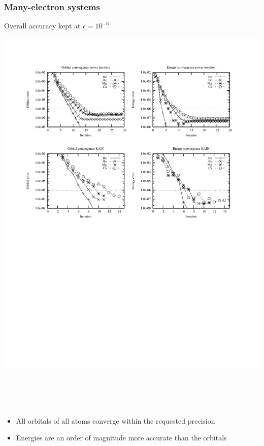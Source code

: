 \begin{frame}
    \frametitle{Many-electron systems}
    \centering
    Overall accuracy kept at $\epsilon = 10^{-6}$
    \begin{center}
	\includegraphics[scale=0.6, clip, viewport = 50 550 550 740]{figures/accuracy.pdf}
    \end{center}
    \ \\
    \ \\
    \ \\
    \begin{itemize}
	\item All orbitals of all atoms converge within the requested precision
	\item Energies are an order of magnitude more accurate than the orbitals
    \end{itemize}
\end{frame}

